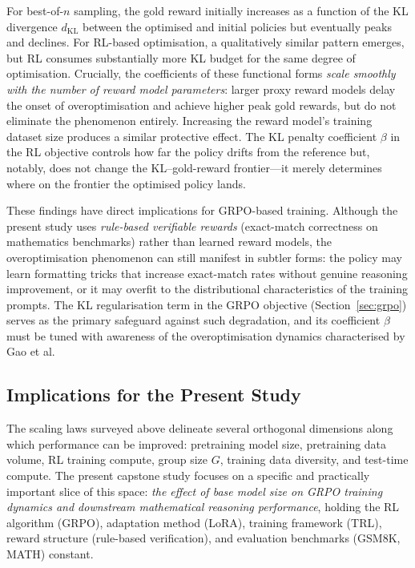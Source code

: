 For best-of-$n$ sampling, the gold reward initially increases as a function of
the KL divergence $d_{\mathrm{KL}}$ between the optimised and initial policies
but eventually peaks and declines.  For RL-based optimisation, a qualitatively
similar pattern emerges, but RL consumes substantially more KL budget for the
same degree of optimisation.  Crucially, the coefficients of these functional
forms \emph{scale smoothly with the number of reward model parameters}: larger
proxy reward models delay the onset of overoptimisation and achieve higher peak
gold rewards, but do not eliminate the phenomenon entirely.  Increasing the
reward model's training dataset size produces a similar protective effect.
The KL penalty coefficient $\beta$ in the RL objective controls how far the
policy drifts from the reference but, notably, does not change the
KL--gold-reward frontier---it merely determines where on the frontier the
optimised policy lands.

These findings have direct implications for GRPO-based training.  Although the
present study uses \emph{rule-based verifiable rewards} (exact-match correctness
on mathematics benchmarks) rather than learned reward models, the
overoptimisation phenomenon can still manifest in subtler forms: the policy may
learn formatting tricks that increase exact-match rates without genuine
reasoning improvement, or it may overfit to the distributional characteristics
of the training prompts.  The KL regularisation term in the GRPO objective
(Section~\ref{sec:grpo}) serves as the primary safeguard against such
degradation, and its coefficient $\beta$ must be tuned with awareness of the
overoptimisation dynamics characterised by Gao et al.

\subsection{Implications for the Present Study}

The scaling laws surveyed above delineate several orthogonal dimensions along
which performance can be improved: pretraining model size, pretraining data
volume, RL training compute, group size $G$, training data diversity, and
test-time compute.  The present capstone study focuses on a specific and
practically important slice of this space: \emph{the effect of base model size
on GRPO training dynamics and downstream mathematical reasoning performance},
holding the RL algorithm (GRPO), adaptation method (LoRA), training framework
(TRL), reward structure (rule-based verification), and evaluation benchmarks
(GSM8K, MATH) constant.

